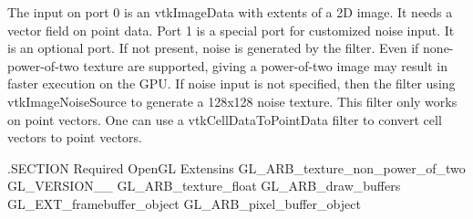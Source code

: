 The input on port 0 is an vtk\-Image\-Data with extents of a 2\-D image. It needs a vector field on point data. Port 1 is a special port for customized noise input. It is an optional port. If not present, noise is generated by the filter. Even if none-\/power-\/of-\/two texture are supported, giving a power-\/of-\/two image may result in faster execution on the G\-P\-U. If noise input is not specified, then the filter using vtk\-Image\-Noise\-Source to generate a 128x128 noise texture. This filter only works on point vectors. One can use a vtk\-Cell\-Data\-To\-Point\-Data filter to convert cell vectors to point vectors.

.S\-E\-C\-T\-I\-O\-N Required Open\-G\-L Extensins G\-L\-\_\-\-A\-R\-B\-\_\-texture\-\_\-non\-\_\-power\-\_\-of\-\_\-two G\-L\-\_\-\-V\-E\-R\-S\-I\-O\-N\-\_\-\_ G\-L\-\_\-\-A\-R\-B\-\_\-texture\-\_\-float G\-L\-\_\-\-A\-R\-B\-\_\-draw\-\_\-buffers G\-L\-\_\-\-E\-X\-T\-\_\-framebuffer\-\_\-object G\-L\-\_\-\-A\-R\-B\-\_\-pixel\-\_\-buffer\-\_\-object

